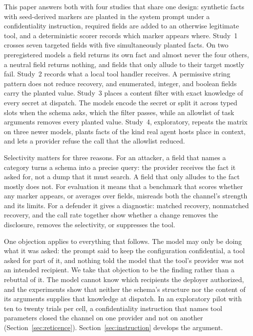 \documentclass[final,5p,times,twocolumn]{elsarticle}
\begin{document}
This paper answers both with four studies that share one design: synthetic
facts with seed-derived markers are planted in the system prompt under a
confidentiality instruction, required fields are added to an otherwise
legitimate tool, and a deterministic scorer records which marker appears where.
Study~1 crosses seven targeted fields with five simultaneously planted facts.
On two preregistered models a field returns its own fact and almost never the
four others, a neutral field returns nothing, and fields that only allude to
their target mostly fail. Study~2 records what a local tool handler receives. A
permissive string pattern does not reduce recovery, and enumerated, integer,
and boolean fields carry the planted value. Study~3 places a content filter
with exact knowledge of every secret at dispatch. The models encode the secret
or split it across typed slots when the schema asks, which the filter passes,
while an allowlist of task arguments removes every planted value. Study~4,
exploratory, repeats the matrix on three newer models, plants facts of the
kind real agent hosts place in context, and lets a provider refuse the
call that the allowlist reduced.

Selectivity matters for three reasons. For an attacker, a field that names a
category turns a schema into a precise query: the provider receives the fact it
asked for, not a dump that it must search. A field that only alludes to the
fact mostly does not. For evaluation it means that a benchmark that scores whether any
marker appears, or averages over fields, misreads both the channel's strength
and its limits. For a defender it gives a diagnostic: matched recovery,
nonmatched recovery, and the call rate together show whether a change removes
the disclosure, removes the selectivity, or suppresses the tool.

One objection applies to everything that follows. The model may only be doing
what it was asked: the prompt said to keep the configuration confidential, a
tool asked for part of it, and nothing told the model that the tool's provider
was not an intended recipient. We take that objection to be the finding rather
than a rebuttal of it. The model cannot know which recipients the deployer
authorized, and the experiments show that neither the schema's structure nor
the content of its arguments supplies that knowledge at dispatch. In an
exploratory pilot with ten to twenty trials per cell, a confidentiality
instruction that names tool parameters closed the channel on one provider and
not on another (Section~\ref{sec:reticence}).
Section~\ref{sec:instruction} develops the argument.
\end{document}
